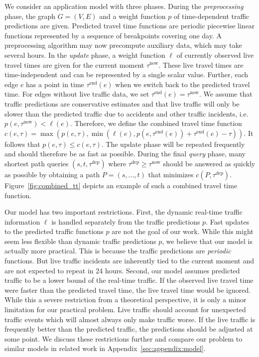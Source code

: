 \documentclass[a4paper,UKenglish,cleveref, autoref, thm-restate]{lipics-v2021}
\newcommand*{\pred}{p}
\newcommand*{\comb}{c}
\newcommand*{\live}{\ell}
\newcommand*{\tdep}{\tau^{\operatorname{dep}}}
\newcommand*{\tend}{\tau^{\operatorname{end}}}
\newcommand*{\tnow}{\tau^{\operatorname{now}}}
\begin{document}
We consider an application model with three phases.
During the \emph{preprocessing} phase, the graph $G=(V,E)$ and a weight function $\pred$ of time-dependent traffic predictions are given.
Predicted travel time functions are periodic piecewise linear functions represented by a sequence of breakpoints covering one day.
A preprocessing algorithm may now precompute auxiliary data, which may take several hours.
In the \emph{update} phase, a weight function $\live$ of currently observed live travel times are given for the current moment $\tnow$.
These live travel times are time-independent and can be represented by a single scalar value.
Further, each edge $e$ has a point in time $\tend(e)$ when we switch back to the predicted travel time.
For edges without live traffic data, we set $\tend(e) = \tnow$.
We assume that traffic predictions are conservative estimates and that live traffic will only be slower than the predicted traffic due to accidents and other traffic incidents, i.e.\ $\pred(e, \tnow) < \live(e)$.
Therefore, we define the combined travel time function $\comb(e, \tau) = \max(\pred(e, \tau), \min(\live(e), \pred(e, \tend(e)) + \tend(e) - \tau))$.
It follows that $\pred(e, \tau) \leq \comb(e, \tau)$.
The update phase will be repeated frequently and should therefore be as fast as possible.
During the final \emph{query} phase, many shortest path queries $(s,t,\tdep)$ where $\tdep \geq \tnow$ should be answered as quickly as possible by obtaining a path $P = (s,\dots,t)$ that minimizes $\comb(P, \tdep)$.
Figure~\ref{fig:combined_tt} depicts an example of such a combined travel time function.

Our model has two important restrictions.
First, the dynamic real-time traffic information $\live$ is handled separately from the traffic predictions $\pred$.
Fast updates to the predicted traffic functions $\pred$ are not the goal of our work.
While this might seem less flexible than dynamic traffic predictions $\pred$, we believe that our model is actually more practical.
This is because the traffic predictions are \emph{periodic} functions.
But live traffic incidents are inherently tied to the current moment and are not expected to repeat in 24 hours.
Second, our model assumes predicted traffic to be a lower bound of the real-time traffic.
If the observed live travel time were faster than the predicted travel time, the live travel time would be ignored.
While this a severe restriction from a theoretical perspective, it is only a minor limitation for our practical problem.
Live traffic should account for unexpected traffic events which will almost always only make traffic worse.
If the live traffic is frequently better than the predicted traffic, the predictions should be adjusted at some point.
We discuss these restrictions further and compare our problem to similar models in related work in Appendix~\ref{sec:appendix:model}.
\end{document}
